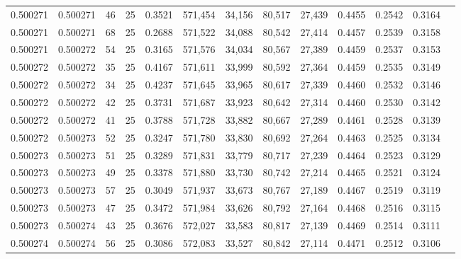 \begin{tabular}{rrrrrrrrrrrrr}
0.500271 & 0.500271 &    46 &  25 &                                     0.3521 & 571,454 &  34,156 &  80,517 &  27,439 & 0.4455 & 0.2542 & 0.3164 \\
0.500271 & 0.500271 &    68 &  25 &                                     0.2688 & 571,522 &  34,088 &  80,542 &  27,414 & 0.4457 & 0.2539 & 0.3158 \\
0.500271 & 0.500272 &    54 &  25 &                                     0.3165 & 571,576 &  34,034 &  80,567 &  27,389 & 0.4459 & 0.2537 & 0.3153 \\
0.500272 & 0.500272 &    35 &  25 &                                     0.4167 & 571,611 &  33,999 &  80,592 &  27,364 & 0.4459 & 0.2535 & 0.3149 \\
0.500272 & 0.500272 &    34 &  25 &                                     0.4237 & 571,645 &  33,965 &  80,617 &  27,339 & 0.4460 & 0.2532 & 0.3146 \\
0.500272 & 0.500272 &    42 &  25 &                                     0.3731 & 571,687 &  33,923 &  80,642 &  27,314 & 0.4460 & 0.2530 & 0.3142 \\
0.500272 & 0.500272 &    41 &  25 &                                     0.3788 & 571,728 &  33,882 &  80,667 &  27,289 & 0.4461 & 0.2528 & 0.3139 \\
0.500272 & 0.500273 &    52 &  25 &                                     0.3247 & 571,780 &  33,830 &  80,692 &  27,264 & 0.4463 & 0.2525 & 0.3134 \\
0.500273 & 0.500273 &    51 &  25 &                                     0.3289 & 571,831 &  33,779 &  80,717 &  27,239 & 0.4464 & 0.2523 & 0.3129 \\
0.500273 & 0.500273 &    49 &  25 &                                     0.3378 & 571,880 &  33,730 &  80,742 &  27,214 & 0.4465 & 0.2521 & 0.3124 \\
0.500273 & 0.500273 &    57 &  25 &                                     0.3049 & 571,937 &  33,673 &  80,767 &  27,189 & 0.4467 & 0.2519 & 0.3119 \\
0.500273 & 0.500273 &    47 &  25 &                                     0.3472 & 571,984 &  33,626 &  80,792 &  27,164 & 0.4468 & 0.2516 & 0.3115 \\
0.500273 & 0.500274 &    43 &  25 &                                     0.3676 & 572,027 &  33,583 &  80,817 &  27,139 & 0.4469 & 0.2514 & 0.3111 \\
0.500274 & 0.500274 &    56 &  25 &                                     0.3086 & 572,083 &  33,527 &  80,842 &  27,114 & 0.4471 & 0.2512 & 0.3106 \\

\end{tabular}
